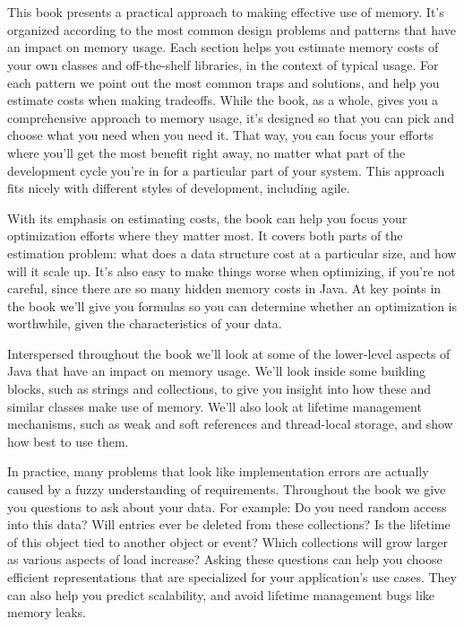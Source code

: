 \section{\thetitle}
This book presents a practical approach to making effective use of memory.
It's organized according to the most common design problems and patterns that
have an impact on memory usage. Each section helps you estimate memory costs of your own classes and off-the-shelf libraries,
in the context of typical
usage. For each pattern we point out the most common traps and solutions, and help you estimate
costs when making tradeoffs.
While the book, as a whole, gives you a comprehensive approach to memory usage,
it's designed so that you can pick and choose what you need when you need it. That way, you can focus your efforts where
you'll get the most benefit right away, no matter what part of the development cycle you're in for a particular part of your
system. This approach fits nicely with different styles of development, including agile. 

With its emphasis on estimating costs, the book can help you focus your
optimization efforts where they matter most. It covers both parts of the estimation problem: what does a
data structure cost at a particular size, and how will it scale up. It's also easy to make things worse when
optimizing, if you're not careful, since there are so many hidden memory costs in Java. At key points in the
book we'll give you formulas so you can determine whether an optimization is worthwhile, 
given the characteristics of your data.

Interspersed throughout the book we'll look at some of the lower-level aspects of Java
that have an impact on memory usage. We'll look inside some building blocks, such as
strings and collections, to give you insight into how these and similar classes make use of memory. 
We'll also look at lifetime management mechanisms, such as weak and soft references and thread-local storage,
and show how best to use them.

In practice, many problems that look like implementation errors are actually caused by a
fuzzy understanding of requirements. Throughout the book we give you questions to
ask about your data. For example: Do you need random access into this data? Will entries ever be
deleted from these collections? Is the lifetime of this object tied to another object or event? Which
collections will grow larger as various aspects of load increase?  Asking these
questions can help you choose efficient representations that are specialized for your application's use cases.
They can also help you predict scalability, and avoid lifetime management bugs
like memory leaks.


